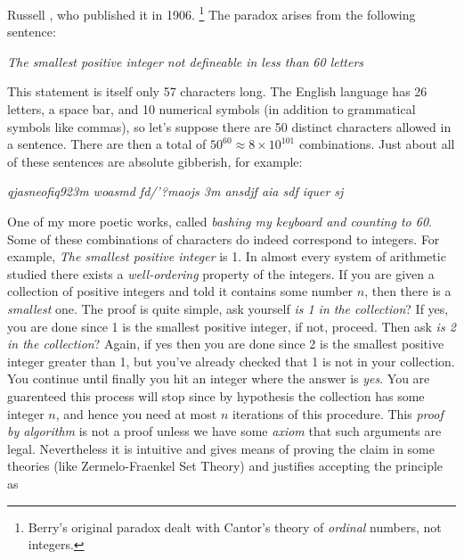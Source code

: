         Russell \cite[p.~63]{CamCompBertRuss03}, who published it in 1906.%
        \footnote{%
            Berry's original paradox dealt with Cantor's theory of
            \textit{ordinal} numbers, not integers.
        }
        The paradox arises from the following sentence:
        \begin{center}
            \textit{The smallest positive integer not defineable in less than}
            \textit{60 letters}
        \end{center}
        This statement is itself only 57 characters long. The English language
        has 26 letters, a space bar, and 10 numerical symbols (in addition to
        grammatical symbols like commas), so let's suppose there are 50 distinct
        characters allowed in a sentence. There are then a total of
        $50^{60}\approx{8}\times{10}^{101}$ combinations. Just about all of
        these sentences are absolute gibberish, for example:
        \begin{center}
            \textit{qjasneofiq923m woasmd fd/'?maojs 3m ansdjf aia sdf iquer sj}
        \end{center}
        One of my more poetic works, called
        \textit{bashing my keyboard and counting to 60}. Some of these
        combinations of characters do indeed correspond to integers. For
        example, \textit{The smallest positive integer} is 1. In almost every
        system of arithmetic studied there exists a \textit{well-ordering}%
         property of the integers. If you are given a
        collection of positive integers and told it contains some number $n$,
        then there is a \textit{smallest} one. The proof is quite simple, ask
        yourself \textit{is 1 in the collection}? If yes, you are done since 1
        is the smallest positive integer, if not, proceed. Then ask
        \textit{is 2 in the collection}? Again, if yes then you are done since
        2 is the smallest positive integer greater than 1, but you've already
        checked that 1 is not in your collection. You continue until finally you
        hit an integer where the answer is \textit{yes}. You are guarenteed this
        process will stop since by hypothesis the collection has some integer
        $n$, and hence you need at most $n$ iterations of this procedure. This
        \textit{proof by algorithm} is not a proof unless we have some
        \textit{axiom} that such arguments are legal. Nevertheless it is
        intuitive and gives means of proving the claim in some theories (like
        Zermelo-Fraenkel Set Theory) and justifies accepting the principle as
